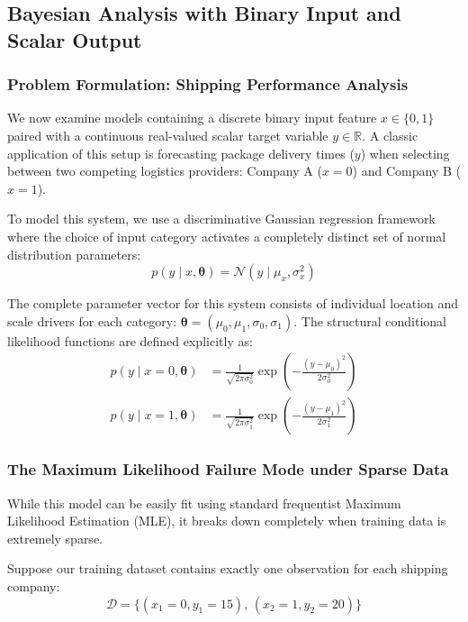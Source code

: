 \documentclass{article}
\begin{document}
\subsection{Bayesian Analysis with Binary Input and Scalar Output}

\subsubsection{Problem Formulation: Shipping Performance Analysis}
We now examine models containing a discrete binary input feature $x \in \{0, 1\}$ paired with a continuous real-valued scalar target variable $y \in \mathbb{R}$. A classic application of this setup is forecasting package delivery times ($y$) when selecting between two competing logistics providers: Company A ($x = 0$) and Company B ($x = 1$).

To model this system, we use a discriminative Gaussian regression framework where the choice of input category activates a completely distinct set of normal distribution parameters:
\begin{equation}
p(y \mid x, \boldsymbol{\theta}) = \mathcal{N}(y \mid \mu_x, \sigma_x^2)
\end{equation}

The complete parameter vector for this system consists of individual location and scale drivers for each category: $\boldsymbol{\theta} = (\mu_0, \mu_1, \sigma_0, \sigma_1)$. The structural conditional likelihood functions are defined explicitly as:
\begin{align}
p(y \mid x=0, \boldsymbol{\theta}) &= \frac{1}{\sqrt{2\pi\sigma_0^2}} \exp\left( -\frac{(y - \mu_0)^2}{2\sigma_0^2} \right) \\
p(y \mid x=1, \boldsymbol{\theta}) &= \frac{1}{\sqrt{2\pi\sigma_1^2}} \exp\left( -\frac{(y - \mu_1)^2}{2\sigma_1^2} \right)
\end{align}

\subsubsection{The Maximum Likelihood Failure Mode under Sparse Data}
While this model can be easily fit using standard frequentist Maximum Likelihood Estimation (MLE), it breaks down completely when training data is extremely sparse. 

Suppose our training dataset contains exactly one observation for each shipping company:
\begin{equation}
\mathcal{D} = \{(x_1 = 0, y_1 = 15), \, (x_2 = 1, y_2 = 20)\}
\end{equation}
\end{document}
